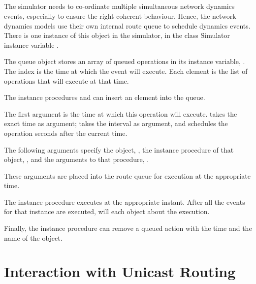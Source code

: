 \subsection{}
\label{sec:rtqueue}

The simulator needs to co-ordinate multiple simultaneous network
dynamics events, especially to ensure the right coherent behaviour.
Hence, the network dynamics models use their own internal 
route queue to schedule dynamics events.
There is one instance of this object in the simulator, in the
class Simulator instance variable .

The queue object stores an array of queued operations
in its instance variable, .
The index is the time at which the event will execute.
Each element is the list of operations that will execute at that time.

The instance procedures
 and
can insert an element into the queue.
\begin{list}{}{}
\item The first argument is the time at which this operation will execute.
   takes the exact time as argument;
   takes the interval as argument, and schedules the
  operation  seconds after the current time.
\item The following arguments specify the object, ,
  the instance procedure of that object, ,
  and the arguments to that procedure, .

  These arguments are placed into the route queue
  for execution at the appropriate time.
\end{list}

The instance procedure
executes  at the appropriate instant.
After all the events for that instance are executed,
 will  each object about the execution.

Finally, the instance procedure
can remove a queued action with the time and the name of the object.

\section{Interaction with Unicast Routing}
\label{sec:unicast-int}

